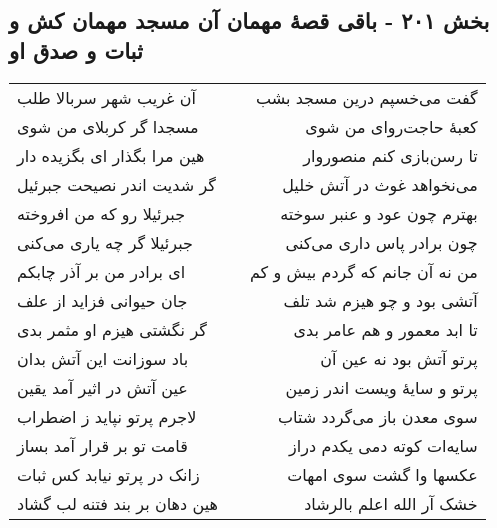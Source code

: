 \begin{center}
\section*{بخش ۲۰۱ - باقی قصهٔ مهمان آن مسجد مهمان کش و ثبات و صدق او}
\label{sec:sh201}
\begin{longtable}{l p{0.5cm} r}
آن غریب شهر سربالا طلب
&&
گفت می‌خسپم درین مسجد بشب
\\
مسجدا گر کربلای من شوی
&&
کعبهٔ حاجت‌روای من شوی
\\
هین مرا بگذار ای بگزیده دار
&&
تا رسن‌بازی کنم منصوروار
\\
گر شدیت اندر نصیحت جبرئیل
&&
می‌نخواهد غوث در آتش خلیل
\\
جبرئیلا رو که من افروخته
&&
بهترم چون عود و عنبر سوخته
\\
جبرئیلا گر چه یاری می‌کنی
&&
چون برادر پاس داری می‌کنی
\\
ای برادر من بر آذر چابکم
&&
من نه آن جانم که گردم بیش و کم
\\
جان حیوانی فزاید از علف
&&
آتشی بود و چو هیزم شد تلف
\\
گر نگشتی هیزم او مثمر بدی
&&
تا ابد معمور و هم عامر بدی
\\
باد سوزانت این آتش بدان
&&
پرتو آتش بود نه عین آن
\\
عین آتش در اثیر آمد یقین
&&
پرتو و سایهٔ ویست اندر زمین
\\
لاجرم پرتو نپاید ز اضطراب
&&
سوی معدن باز می‌گردد شتاب
\\
قامت تو بر قرار آمد بساز
&&
سایه‌ات کوته دمی یکدم دراز
\\
زانک در پرتو نیابد کس ثبات
&&
عکسها وا گشت سوی امهات
\\
هین دهان بر بند فتنه لب گشاد
&&
خشک آر الله اعلم بالرشاد
\\
\end{longtable}
\end{center}
